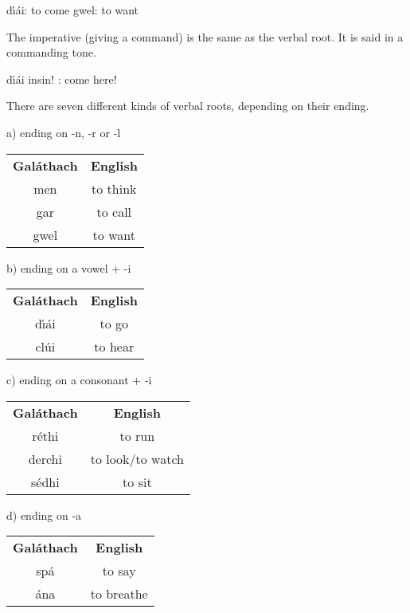 d\'{\i}\'{a}i: to come
gwel: to want

The imperative (giving a command) is the same as the verbal root. It is said in a commanding tone.

d\'{\i}\'{a}i insin! : come here!

There are seven different kinds of verbal roots, depending on their ending.

a) ending on -n, -r or -l

\begin{table}[H]
\centering
\begin{tabular}{cc}
  \toprule
  \textbf{Gal\'{a}thach} & \textbf{English}\\
  \cmidrule(lr){1-1}\cmidrule(lr){2-2}
  men & to think\\
  gar & to call\\
  gwel & to want\\
  \bottomrule
\end{tabular}
\label{examples_ending_n_r_l}
\end{table}

b) ending on a vowel + -i

\begin{table}[H]
\centering
\begin{tabular}{cc}
  \toprule
  \textbf{Gal\'{a}thach} & \textbf{English}\\
  \cmidrule(lr){1-1}\cmidrule(lr){2-2}
  d\'{\i}\'{a}i & to go\\
  cl\'{u}i & to hear\\
  \bottomrule
\end{tabular}
\label{examples_ending_vowel_i}
\end{table}

c) ending on a consonant + -i

\begin{table}[H]
\centering
\begin{tabular}{cc}
  \toprule
  \textbf{Gal\'{a}thach} & \textbf{English}\\
  \cmidrule(lr){1-1}\cmidrule(lr){2-2}
  r\'{e}thi & to run\\
  derchi & to look/to watch\\
  s\'{e}dhi & to sit\\
  \bottomrule
\end{tabular}
\label{examples_ending_consonant_i}
\end{table}

d) ending on -a

\begin{table}[H]
\centering
\begin{tabular}{cc}
  \toprule
  \textbf{Gal\'{a}thach} & \textbf{English}\\
  \cmidrule(lr){1-1}\cmidrule(lr){2-2}
  sp\'{a} & to say\\
  \'{a}na & to breathe\\
  \bottomrule
\end{tabular}
\label{examples_ending_a}
\end{table}

